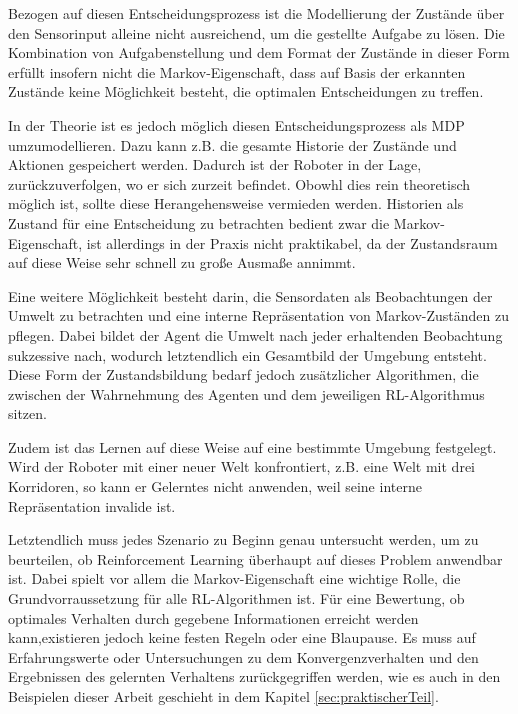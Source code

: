 Bezogen auf diesen Entscheidungsprozess ist die Modellierung der Zustände über den Sensorinput alleine nicht ausreichend, um die gestellte Aufgabe zu lösen. Die Kombination von Aufgabenstellung und dem Format der Zustände in dieser Form erfüllt insofern nicht die Markov-Eigenschaft, dass auf Basis der erkannten Zustände keine Möglichkeit besteht, die optimalen Entscheidungen zu treffen. 
\par

In der Theorie ist es jedoch möglich diesen Entscheidungsprozess als MDP umzumodellieren.
Dazu kann z.B. die gesamte Historie der Zustände und Aktionen gespeichert werden. Dadurch ist der Roboter in der Lage, zurückzuverfolgen, wo er sich zurzeit befindet. Obowhl dies rein theoretisch möglich ist, sollte diese Herangehensweise vermieden werden. Historien als Zustand für eine Entscheidung zu betrachten bedient zwar die Markov-Eigenschaft, ist allerdings in der Praxis nicht praktikabel, da der Zustandsraum auf diese Weise sehr schnell zu große Ausmaße annimmt.
\par 
Eine weitere Möglichkeit besteht darin, die Sensordaten als Beobachtungen der Umwelt zu betrachten und eine interne Repräsentation von Markov-Zuständen zu pflegen. Dabei bildet der Agent die Umwelt nach jeder erhaltenden Beobachtung suk­zes­si­ve nach, wodurch letztendlich ein Gesamtbild der Umgebung entsteht. Diese Form der Zustandsbildung bedarf jedoch zusätzlicher Algorithmen, die zwischen der Wahrnehmung des Agenten und dem jeweiligen RL-Algorithmus sitzen. 
\par 
Zudem ist das Lernen auf diese Weise auf eine bestimmte Umgebung festgelegt. Wird der Roboter mit einer neuer Welt konfrontiert, z.B. eine Welt mit drei Korridoren, so kann er Gelerntes nicht anwenden, weil seine interne Repräsentation invalide ist.
\par 
Letztendlich muss jedes Szenario zu Beginn genau untersucht werden, um zu beurteilen, ob Reinforcement Learning überhaupt auf dieses Problem anwendbar ist. Dabei spielt vor allem die Markov-Eigenschaft eine wichtige Rolle, die Grundvorraussetzung für alle RL-Algorithmen ist. Für eine Bewertung, ob optimales Verhalten durch gegebene Informationen erreicht werden kann,existieren jedoch keine festen Regeln oder eine Blaupause. Es muss auf Erfahrungswerte oder Untersuchungen zu dem Konvergenzverhalten und den Ergebnissen des gelernten Verhaltens zurückgegriffen werden, wie es auch in den Beispielen dieser Arbeit geschieht in dem Kapitel \ref{sec:praktischerTeil}.
